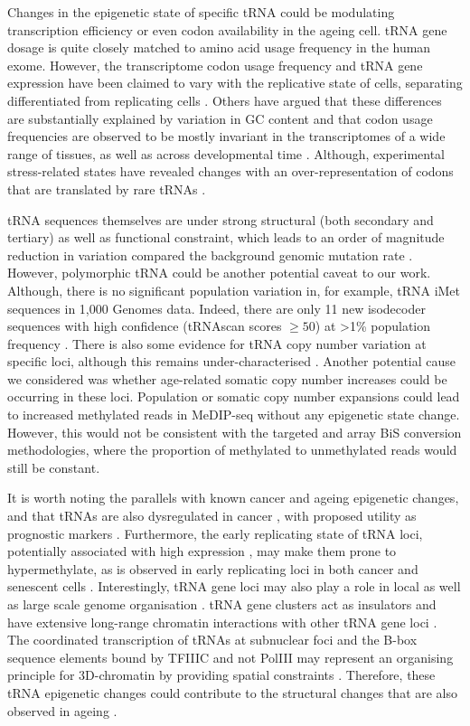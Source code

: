 \documentclass[]{book}
\begin{document}
Changes in the epigenetic state of specific tRNA could be modulating transcription efficiency or even codon availability in the ageing cell.
tRNA gene dosage is quite closely matched to amino acid usage frequency in the human exome.
However, the transcriptome codon usage frequency and tRNA gene expression have been claimed to vary with the replicative state of cells, separating differentiated from replicating cells \citep{Gingold2014}.
Others have argued that these differences are substantially explained by variation in GC content \citep{Rudolph2016} and that codon usage frequencies are observed to be mostly invariant in the transcriptomes of a wide range of tissues, as well as across developmental time \citep{Schmitt2014}.
Although, experimental stress-related states have revealed changes with an over-representation of codons that are translated by rare tRNAs \citep{Gingold2012}.

tRNA sequences themselves are under strong structural (both secondary and tertiary) \citep{Goodenbour2006} as well as functional constraint, which leads to an order of magnitude reduction in variation compared the background genomic mutation rate \citep{Parisien2013}.
However, polymorphic tRNA could be another potential caveat to our work.
Although, there is no significant population variation in, for example, tRNA iMet sequences in 1,000 Genomes data.
Indeed, there are only 11 new isodecoder sequences with high confidence (tRNAscan scores \(\ge50\)) at \textgreater1\% population frequency \citep{Parisien2013}.
There is also some evidence for tRNA copy number variation at specific loci, although this remains under-characterised \citep{Iben2015, Darrow2014}.
Another potential cause we considered was whether age-related somatic copy number increases could be occurring in these loci.
Population or somatic copy number expansions could lead to increased methylated reads in MeDIP-seq without any epigenetic state change.
However, this would not be consistent with the targeted and array BiS conversion methodologies, where the proportion of methylated to unmethylated reads would still be constant.

It is worth noting the parallels with known cancer and ageing epigenetic changes, and that tRNAs are also dysregulated in cancer \citep{Huang2018}, with proposed utility as prognostic markers \citep{Krishnan2016}.
Furthermore, the early replicating state of tRNA loci, potentially associated with high expression \citep{Muller2017}, may make them prone to hypermethylate, as is observed in early replicating loci in both cancer \citep{Du2019} and senescent cells \citep{Cruickshanks2013}.
Interestingly, tRNA gene loci may also play a role in local as well as large scale genome organisation \citep[Hamdani2019;][]{VanBortle2017}.
tRNA gene clusters act as insulators \citep{Raab2011} and have extensive long-range chromatin interactions with other tRNA gene loci \citep{VanBortle2017}.
The coordinated transcription of tRNAs at subnuclear foci and the B-box sequence elements bound by TFIIIC and not PolIII may represent an organising principle for 3D-chromatin by providing spatial constraints \citep{Noma2006}.
Therefore, these tRNA epigenetic changes could contribute to the structural changes that are also observed in ageing \citep{Sun2018}.
\end{document}
